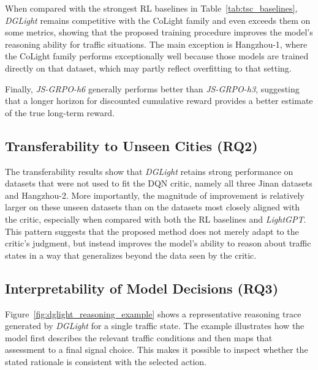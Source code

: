 When compared with the strongest RL baselines in Table~\ref{tab:tsc_baselines}, \textit{DGLight} remains competitive with the CoLight family and even exceeds them on some metrics, showing that the proposed training procedure improves the model's reasoning ability for traffic situations. The main exception is Hangzhou-1, where the CoLight family performs exceptionally well because those models are trained directly on that dataset, which may partly reflect overfitting to that setting.

Finally, \textit{JS-GRPO-h6} generally performs better than \textit{JS-GRPO-h3}, suggesting that a longer horizon for discounted cumulative reward provides a better estimate of the true long-term reward.

\subsection{Transferability to Unseen Cities (RQ2)}
The transferability results show that \textit{DGLight} retains strong performance on datasets that were not used to fit the DQN critic, namely all three Jinan datasets and Hangzhou-2. More importantly, the magnitude of improvement is relatively larger on these unseen datasets than on the datasets most closely aligned with the critic, especially when compared with both the RL baselines and \textit{LightGPT}. This pattern suggests that the proposed method does not merely adapt to the critic's judgment, but instead improves the model's ability to reason about traffic states in a way that generalizes beyond the data seen by the critic.

\subsection{Interpretability of Model Decisions (RQ3)}
Figure~\ref{fig:dglight_reasoning_example} shows a representative reasoning trace generated by \textit{DGLight} for a single traffic state. The example illustrates how the model first describes the relevant traffic conditions and then maps that assessment to a final signal choice. This makes it possible to inspect whether the stated rationale is consistent with the selected action.

